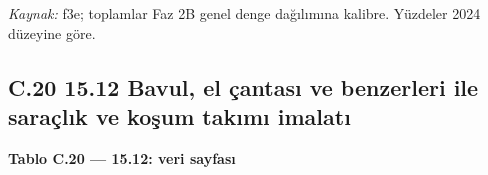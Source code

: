\emph{Kaynak:} \etiketT{} f3e; toplamlar Faz 2B genel denge dağılımına kalibre. Yüzdeler 2024 düzeyine göre.

\hypertarget{nace_kartlar_13-15-c20-1512-bavul-el-uxe7antasux131-ve-benzerleri-ile-sarauxe7lux131k-ve-koux15fum-takux131mux131-imalatux131}{%
\subsection{C.20 15.12 Bavul, el çantası ve benzerleri ile saraçlık ve koşum takımı imalatı}\label{nace_kartlar_13-15-c20-1512-bavul-el-uxe7antasux131-ve-benzerleri-ile-sarauxe7lux131k-ve-koux15fum-takux131mux131-imalatux131}}


\textbf{Tablo C.20 --- 15.12: veri sayfası}

\nopagebreak[4]

\begingroup\gbtablo\small

